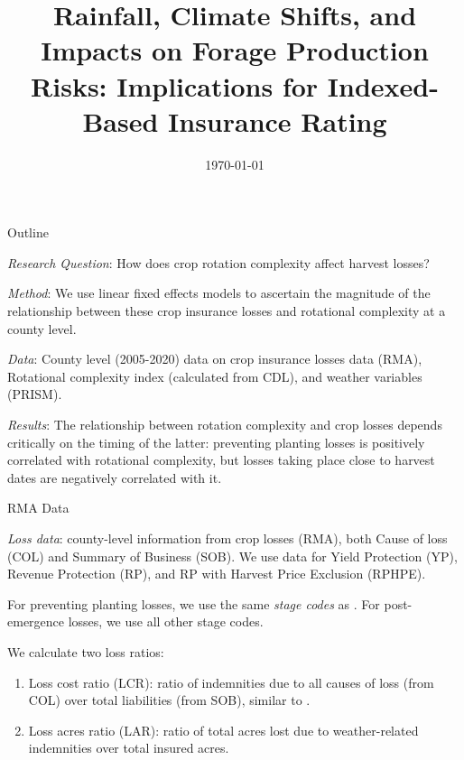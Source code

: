 \documentclass[notes,11pt, aspectratio=169]{beamer}
\date{\today}
\title[]{Rainfall, Climate Shifts, and Impacts on Forage Production Risks: Implications for Indexed-Based Insurance Rating}
\author[VEF]{}
\institute[UARK]{\small{\begin{tabular}{c c c}
			Lawson Connor && Victor Funes-Leal && Eunchun Park\\
			\multicolumn{3}{c}{\small Department of Agricultural Economics and Agribusiness}\\ 
			\multicolumn{3}{c}{\small University of Arkansas}\\
\end{tabular}}}
\newenvironment{wideitemize}{\itemize\addtolength{\itemsep}{10pt}}{\enditemize}
\begin{document}
 
\begin{frame}
	\maketitle
	\centering 
\end{frame}

\begin{frame}{Outline}
\begin{wideitemize}
    \item \emph{Research Question}: How does crop rotation complexity affect harvest losses?
    \item \emph{Method}: We use linear fixed effects models to ascertain the magnitude of the relationship between these crop insurance losses and rotational complexity at a county level.
    \item \emph{Data}: County level (2005-2020) data on crop insurance losses data (RMA), Rotational complexity index (calculated from CDL), and weather variables (PRISM).
    \item \emph{Results}: The relationship between rotation complexity and crop losses depends critically on the timing of the latter: preventing planting losses is positively correlated with rotational complexity, but losses taking place close to harvest dates are negatively correlated with it.
\end{wideitemize}
\end{frame}

\begin{frame}{RMA Data}
    \begin{wideitemize}
        \item \emph{Loss data}: county-level information from crop losses (RMA), both Cause of loss (COL) and Summary of Business (SOB). We use data for Yield Protection (YP), Revenue Protection (RP), and RP with Harvest Price Exclusion (RPHPE). 
        \item For preventing planting losses, we use the same \textit{stage codes} as \cite{won2024}. For post-emergence losses, we use all other stage codes. 
        \item We calculate two loss ratios:
        \begin{enumerate}
            \item Loss cost ratio (LCR): ratio of indemnities due to all causes of loss (from COL) over total liabilities (from SOB), similar to \cite{yu2024}.
            \item Loss acres ratio (LAR): ratio of total acres lost due to weather-related indemnities over total insured acres. 
        \end{enumerate}
    \end{wideitemize}
\end{frame}
\end{document}
